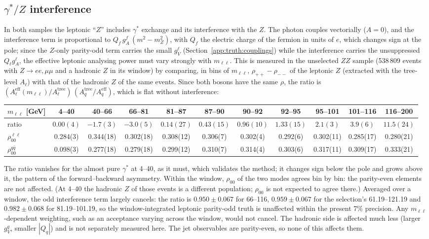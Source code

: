 \subsection{$\gamma^*/Z$ interference}
\label{app:truth:interference}
In both samples the leptonic ``$Z$'' includes $\gamma^*$ exchange and its interference with the $Z$. The photon couples
vectorially ($A = 0$), and the interference term is proportional to $Q_f\,g_A^f\,(m^2 - m_Z^2)$, with $Q_f$ the electric charge of the fermion in
units of $e$, which changes sign at
the pole; since the $Z$-only parity-odd term carries the small $g_V^\ell$ (Section~\ref{app:truth:couplings}) while the
interference carries the unsuppressed $Q_\ell g_A^\ell$, the effective leptonic analysing power must vary strongly with
$m_{\ell\ell}$. This is measured in the unselected $ZZ$ sample (538\,809 events with $Z\to ee,\mu\mu$ and a hadronic
$Z$ in its window) by comparing, in bins of $m_{\ell\ell}$, $\rho_{++}-\rho_{--}$ of the leptonic $Z$ (extracted with the
tree-level $A_\ell$) with that of the hadronic $Z$ of the same events. Since both bosons have the same $\rho$, the ratio
is $(A_\ell^\mathrm{eff}(m_{\ell\ell})/A_\ell^\mathrm{tree})\,(A_q^\mathrm{tree}/A_q^\mathrm{eff})$, which is flat
without interference:
\begin{center}
\footnotesize
\setlength{\tabcolsep}{2.5pt}
\begin{tabular}{lcccccccccc}
\toprule
$m_{\ell\ell}$ [GeV] & 4--40 & 40--66 & 66--81 & 81--87 & 87--90 & 90--92 & 92--95 & 95--101 & 101--116 & 116--200 \\
\midrule
ratio & $0.00(4)$ & $-1.7(3)$ & $-3.0(5)$ & $0.14(27)$ & $0.43(15)$ & $0.96(10)$ & $1.33(15)$ & $2.1(3)$ & $3.9(6)$ & $11.5(24)$ \\
$\rho_{00}^{\ell\ell}$ & 0.284(3) & 0.344(18) & 0.302(18) & 0.308(12) & 0.306(7) & 0.302(4) & 0.292(6) & 0.302(11) & 0.285(17) & 0.280(21) \\
$\rho_{00}^{q\bar q}$ & 0.098(3) & 0.277(18) & 0.279(18) & 0.299(12) & 0.310(7) & 0.314(4) & 0.303(6) & 0.317(11) & 0.309(17) & 0.333(21) \\
\bottomrule
\end{tabular}
\end{center}
The ratio vanishes for the almost pure $\gamma^*$ at 4--40\GeV, as it must, which validates the method; it changes sign
below the pole and grows above it, the pattern of the forward--backward asymmetry. Within the window, $\rho_{00}$ of
the two modes agrees bin by bin: the parity-even elements are not affected. (At 4--40\GeV{} the hadronic $Z$ of those
events is a different population; $\rho_{00}$ is not expected to agree there.) Averaged over a window, the odd
interference term largely cancels: the ratio is $0.950 \pm 0.067$ for 66--116\GeV, $0.959 \pm 0.067$ for the
selection's 61.19--121.19\GeV{} and $0.982 \pm 0.068$ for 81.19--101.19\GeV, so the window-integrated leptonic parity-odd
truth is unaffected within the present 7\% precision. Any $m_{\ell\ell}$-dependent weighting, such as an acceptance
varying across the window, would not cancel. The hadronic side is affected much less (larger $g_V^q$, smaller $|Q_q|$)
and is not separately measured here. The jet observables are parity-even, so none of this affects them.


